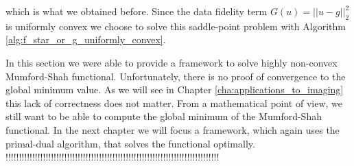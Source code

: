         which is what we obtained before. Since the data fidelity term $G(u) = ||u - g||_{2}^{2}$ is uniformly convex we choose to solve this saddle-point problem with Algorithm \ref{alg:f_star_or_g_uniformly_convex}.

        In this section we were able to provide a framework to solve highly non-convex Mumford-Shah functional. Unfortunately, there is no proof of convergence to the global minimum value. As we will see in Chapter \ref{cha:applications_to_imaging} this lack of correctness does not matter. From a mathematical point of view, we still want to be able to compute the global minimum of the Mumford-Shah functional. In the next chapter we will focus a framework, which again uses the primal-dual algorithm, that solves the functional optimally.
        !!!!!!!!!!!!!!!!!!!!!!!!!!!!!!!!!!!!!!!!!!!!!!!!!!!!!!!!!!!!!!!!!!!!!!!!!!!!!!!!


